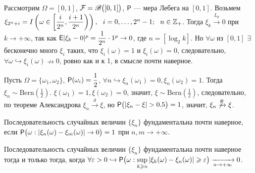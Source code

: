 \begin{example}
	Рассмотрим $\Omega = [0, 1]$, $\F = \B\big([0,1] \big)$, $\P$ --- мера Лебега на $[0, 1]$. 
	Возьмем $\xi_{2^n + i} = I \left( \omega \in \left[ \dfrac{i}{2^n}, \dfrac{i + 1}{2^n} \right) \right), ~~i = 0,\ldots, 2^n - 1;~~n \in \Z_+$. 
	Тогда $\xi_k \xrightarrow{L_p} 0$ при $k \rightarrow + \infty$, так как $\E | \xi_k  - 0 |^p = \dfrac{1}{2^n} \cdot 1^p \rightarrow 0$, где $n = \left[ \log_2 k \right]$. 
	Но $\forall \omega$ из $[0,1]$ $\exists$ бесконечно много $\xi_i$ таких, что $\xi_i(\omega) = 1$ и $\xi_i(\omega) = 0$, следовательно, $\forall \omega \hookrightarrow \xi_i(\omega) \nrightarrow 0$, ровно как и к 1, в смысле почти наверное.
\end{example}

\begin{example} 
	Пусть $\Omega = \{ \omega_1, \omega_2 \}$, $\P(\omega_i) = \dfrac{1}{2}$, $\forall n \hookrightarrow \xi_n(\omega_1) = 0, \xi_n(\omega_2) = 1$. Тогда $\xi_n \sim \text{Bern} \left( \frac{1}{2} \right)$. $\xi(\omega_1) = 1, \xi(\omega_2) = 0$, значит, $\xi \sim \text{Bern} \left( \frac{1}{2} \right)$, следовательно, по теореме Александрова $\xi_n \xrightarrow{d} \xi$, но $\P \big( | \xi_n - \xi| > 0.5 \big) = 1$, значит, $\xi_n \not\xrightarrow{\P} \xi$. 
\end{example}

\begin{definition}
    Последовательность случайных величин $\{ \xi_n \}$ фундаментальна почти наверное, если $\P  \big( \omega : | \xi_n(\omega) - \xi_m(\omega) | \rightarrow 0 \big) = 1$ при $n, m \rightarrow + \infty$.
\end{definition}

\begin{lemma}
	Последовательность случайных величин $\{ \xi_n \}$ фундаментальна почти наверное тогда и только тогда, когда $\forall \varepsilon > 0 \hookrightarrow \P\big(\omega: \sup\limits_{k \geqslant n} | \xi_k(\omega) - \xi_n(\omega) | \geqslant \varepsilon \big) \limn 0$.
\end{lemma}

